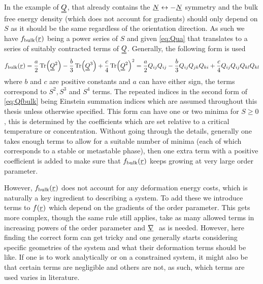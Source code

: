 \documentclass[12pt]{article}
\newcommand{\suf}[2]{\stackunder[0.5pt]{\stackunder[1pt]{\ensuremath{#1}}{\rule{\widthof{\ensuremath{#2}}*\real{0.9}}{.1ex}}}{}}
\newcommand{\duf}[2]{\stackunder[0.5pt]{\stackunder[0.8pt]{\stackunder[1pt]{\ensuremath{#1}}{\rule{\widthof{\ensuremath{#2}}*\real{0.9}}{.1ex}}}{\rule{\widthof{\ensuremath{#2}}*\real{0.9}}{.1ex}}}{}}
\newcommand{\su}[1]{\suf{#1}{#1}}
\newcommand{\du}[1]{\duf{#1}{#1}}
\newcommand{\mgrad}{\ensuremath{\suf{\nabla}{K}\,}}
\newcommand{\QQ}{\ensuremath{\du{Q}}}
\begin{document}
        In the example of \QQ, that already contains the $\su{N} \leftrightarrow -\su{N}$ symmetry and the bulk free energy density (which does not account for gradients) should only depend on $S$ as it should be the same regardless of the orientation direction.
        As such we have $f_\text{bulk}(\su{r})$ being a power series of $S$ and given \cref{eq:Qua} that translates to a series of suitably contracted terms of \QQ.
        Generally, the following form is used
        \begin{equation}\label{eq:Qfbulk}
            f_\text{bulk}(\su{r}) = \frac{a}{2} \Tr(\du{Q}^2) - \frac{b}{3} \Tr(\du{Q}^3) + \frac{c}{4} \Tr(\du{Q}^2)^2 = \frac{a}{2} Q_{ij}Q_{ij} - \frac{b}{3} Q_{ij}Q_{jk}Q_{ki} + \frac{c}{4} Q_{ij}Q_{ij}Q_{kl}Q_{kl}
        \end{equation}
        where $b$ and $c$ are positive constants and $a$ can have either sign, the terms correspond to $S^2, S^3$ and $S^4$ terms\cite{brayTheoryPhaseOrdering1993,luckhurstBiaxialNematicLiquid2015}.
        The repeated indices in the second form of \cref{eq:Qfbulk} being Einstein summation indices which are assumed throughout this thesis unless otherwise specified.
        This form can have one or two minima for $S\geq0$, this is determined by the coefficients which are set relative to a critical temperature or concentration.
        Without going through the details, generally one takes enough terms to allow for a suitable number of minima (each of which corresponds to a stable or metastable phase), then one extra term with a positive coefficient is added to make sure that $f_\text{bulk}(\su{r})$ keeps growing at very large order parameter.

        However, $f_\text{bulk}(\su{r})$ does not account for any deformation energy costs, which is naturally a key ingredient to describing a system.
        To add these we introduce terms to $f(\su{r})$ which depend on the gradients of the order parameter.
        This gets more complex, though the same rule still applies, take as many allowed terms in increasing powers of the order parameter and \mgrad\ as is needed.
        However, here finding the correct form can get tricky and one generally starts considering specific geometries of the system and what their deformation terms should be like.
        If one is to work analytically or on a constrained system, it might also be that certain terms are negligible and others are not, as such, which terms are used varies in literature.
\end{document}
